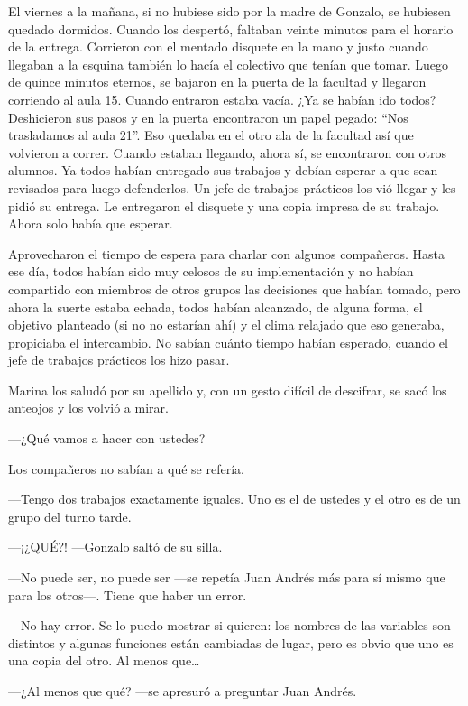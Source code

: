 \documentclass[12pt,twoside,openright]{book}
\begin{document}
El viernes a la mañana, si no hubiese sido por la madre de Gonzalo, se hubiesen quedado dormidos. Cuando los despertó, faltaban veinte minutos para el horario de la entrega. Corrieron con el mentado disquete en la mano y justo cuando llegaban a la esquina también lo hacía el colectivo que tenían que tomar. Luego de quince minutos eternos, se bajaron en la puerta de la facultad y llegaron corriendo al aula 15. Cuando entraron estaba vacía. ¿Ya se habían ido todos? Deshicieron sus pasos y en la puerta encontraron un papel pegado: “Nos trasladamos al aula 21”. Eso quedaba en el otro ala de la facultad así que volvieron a correr. Cuando estaban llegando, ahora sí, se encontraron con otros alumnos. Ya todos habían entregado sus trabajos y debían esperar a que sean revisados para luego defenderlos. Un jefe de trabajos prácticos los vió llegar y les pidió su entrega. Le entregaron el disquete y una copia impresa de su trabajo. Ahora solo había que esperar.

Aprovecharon el tiempo de espera para charlar con algunos compañeros. Hasta ese día, todos habían sido muy celosos de su implementación y no habían compartido con miembros de otros grupos las decisiones que habían tomado, pero ahora la suerte estaba echada, todos habían alcanzado, de alguna forma, el objetivo planteado (si no no estarían ahí) y el clima relajado que eso generaba, propiciaba el intercambio. No sabían cuánto tiempo habían esperado, cuando el jefe de trabajos prácticos los hizo pasar.

Marina los saludó por su apellido y, con un gesto difícil de descifrar, se sacó los anteojos y los volvió a mirar.

---¿Qué vamos a hacer con ustedes?

Los compañeros no sabían a qué se refería.

---Tengo dos trabajos exactamente iguales. Uno es el de ustedes y el otro es de un grupo del turno tarde.

---¡¿QUÉ?! ---Gonzalo saltó de su silla.

---No puede ser, no puede ser ---se repetía Juan Andrés más para sí mismo que para los otros---. Tiene que haber un error.

---No hay error. Se lo puedo mostrar si quieren: los nombres de las variables son distintos y algunas funciones están cambiadas de lugar, pero es obvio que uno es una copia del otro. Al menos que…

---¿Al menos que qué? ---se apresuró a preguntar Juan Andrés.
\end{document}
